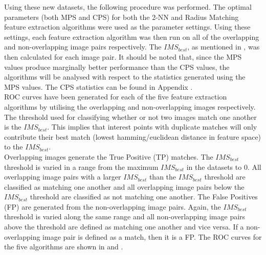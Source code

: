 \documentclass[11pt]{report}
\begin{document}
Using these new datasets, the following procedure was performed. The optimal parameters (both MPS and CPS) for both the 2-NN and Radius Matching feature extraction algorithms were used as the parameter settings. Using these settings, each feature extraction algorithm was then run on all of the overlapping and non-overlapping image pairs respectively. The $IMS_{best}$, as mentioned in , was then calculated for each image pair. It should be noted that, since the MPS values produce marginally better performance than the CPS values, the algorithms will be analysed with respect to the statistics generated using the MPS values. The CPS statistics can be found in Appendix . \\

ROC curves have been generated for each of the five feature extraction algorithms by utilising the overlapping and non-overlapping images respectively. The threshold used for classifying whether or not two images match one another is the $IMS_{best}$. This implies that interest points with duplicate matches will only contribute their best match (lowest hamming/euclidean distance in feature space) to the $IMS_{best}$. \\

Overlapping images generate the True Positive (TP) matches. The $IMS_{best}$ threshold is varied in a range from the maximum $IMS_{best}$ in the datasets to $0$.  All overlapping image pairs with a larger $IMS_{best}$ than the $IMS_{best}$ threshold are classified as matching one another and all overlapping image pairs below the $IMS_{best}$ threshold are classified as not matching one another. The False Positives (FP) are generated from the non-overlapping image pairs. Again, the $IMS_{best}$ threshold is varied along the same range and all non-overlapping image pairs above the threshold are defined as matching one another and vice versa. If a non-overlapping image pair is defined as a match, then it is a FP. The ROC curves for the five algorithms are shown in  and .\\
\end{document}
